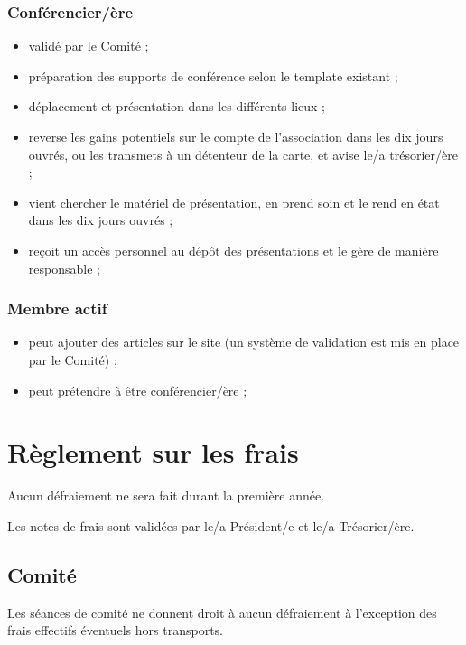 \documentclass[12pt,twoside]{report}
\begin{document}
\subsection*{Conférencier/ère}
\begin{itemize}
\item validé par le Comité ;
\item préparation des supports de conférence selon le template existant ;
\item déplacement et présentation dans les différents lieux ;
\item reverse les gains potentiels sur le compte de l’association dans les dix jours ouvrés, ou les transmets à un détenteur de la carte, et avise le/a trésorier/ère ;
\item vient chercher le matériel de présentation, en prend soin et le rend en état dans les dix jours ouvrés ;
\item reçoit un accès personnel au dépôt des présentations et le gère de manière responsable ;
\end{itemize}

\subsection*{Membre actif}
\begin{itemize}
\item peut ajouter des articles sur le site (un système de validation est mis en place par le Comité) ;
\item peut prétendre à être conférencier/ère ;
\end{itemize}

\chapter*{Règlement sur les frais}

Aucun défraiement ne sera fait durant la première année.

Les notes de frais sont validées par le/a Président/e et le/a Trésorier/ère.

\section*{Comité}

Les séances de comité ne donnent droit à aucun défraiement à l’exception des frais effectifs éventuels hors transports.
\end{document}
